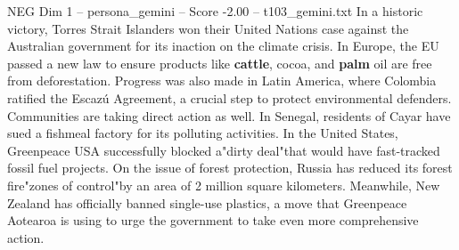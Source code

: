 \begin{textsample}{NEG Dim 1 – persona\_gemini – Score -2.00 – t103\_gemini.txt}  \label{ex:f1_neg_004}
In a historic victory, Torres Strait Islanders won their United Nations case against the Australian government for its inaction on the climate crisis.
In Europe, the EU passed a new law to ensure products like \textbf{cattle}, cocoa, and \textbf{palm} oil are free from deforestation.
Progress was also made in Latin America, where Colombia ratified the Escazú Agreement, a crucial step to protect environmental defenders.
Communities are taking direct action as well.
In Senegal, residents of Cayar have sued a fishmeal factory for its polluting activities.
In the United States, Greenpeace USA successfully blocked a"dirty deal"that would have fast-tracked fossil fuel projects.
On the issue of forest protection, Russia has reduced its forest fire"zones of control"by an area of 2 million square kilometers.
Meanwhile, New Zealand has officially banned single-use plastics, a move that Greenpeace Aotearoa is using to urge the government to take even more comprehensive action.

\end{textsample}
